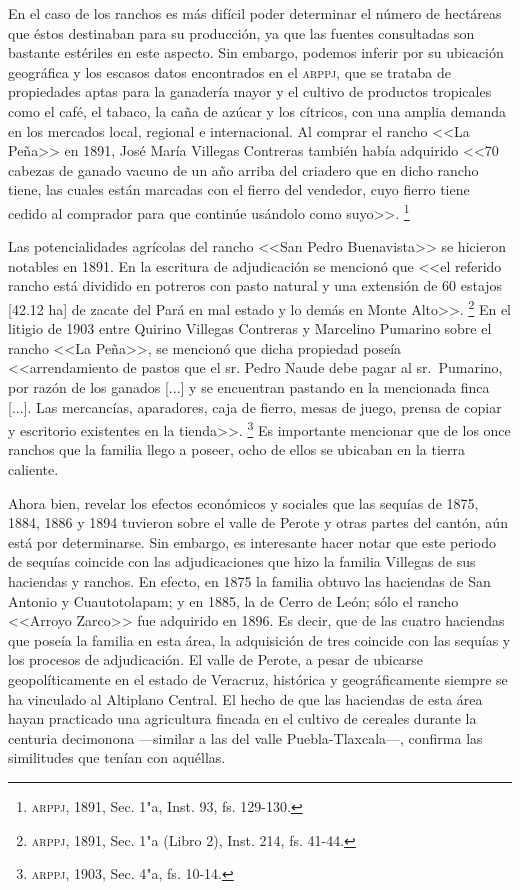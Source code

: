 \documentclass[14pt,twoside,final]{extbook} %
\let\oldfootnote\footnote
\renewcommand\footnote[1]{%
\oldfootnote{\hspace{1mm}#1}}
\begin{document}
En el caso de los ranchos es más difícil poder determinar el número de hectáreas que éstos destinaban para su producción, ya que las fuentes consultadas son bastante estériles en este aspecto. Sin embargo, podemos inferir por su ubicación geográfica y los escasos datos encontrados en el \textsc{arppj}, que se trataba de propiedades aptas para la ganadería mayor y el cultivo de productos tropicales como el café, el tabaco, la caña de azúcar y los cítricos, con una amplia demanda en los mercados local, regional e internacional. Al comprar el rancho <<La Peña>> en 1891, José María Villegas Contreras también había adquirido <<70 cabezas de ganado vacuno de un año arriba del
criadero que en dicho rancho tiene, las cuales están marcadas con el fierro del vendedor, cuyo fierro tiene cedido al comprador para que continúe usándolo como suyo>>.\footnote{\textsc{arppj}, 1891, Sec. 1"a, Inst. 93, fs. 129-130.}

Las potencialidades agrícolas del rancho <<San Pedro Buenavista>> se hicieron notables en 1891. En la escritura de adjudicación se mencionó que <<el referido rancho está dividido en potreros con pasto natural y una extensión de 60 estajos [42.12 ha] de zacate del Pará en mal estado y lo demás en Monte Alto>>.\footnote{\textsc{arppj}, 1891, Sec. 1"a (Libro 2), Inst. 214, fs. 41-44.} En el litigio de 1903 entre Quirino Villegas Contreras y Marcelino Pumarino sobre el rancho <<La Peña>>, se mencionó que dicha propiedad poseía <<arrendamiento de pastos que el sr. Pedro Naude debe pagar al sr.~Pumarino, por razón de los ganados [...] y se encuentran pastando en la mencionada finca [...]. Las mercancías, aparadores, caja de fierro, mesas de juego, prensa de copiar y escritorio existentes en la tienda>>.\footnote{\textsc{arppj}, 1903, Sec. 4"a, fs. 10-14.} Es importante mencionar que de los once ranchos que la familia llego a poseer, ocho de ellos se ubicaban en la tierra caliente.

Ahora bien, revelar los efectos económicos y sociales que las sequías de 1875, 1884, 1886 y 1894 tuvieron sobre el valle de Perote y otras partes del cantón, aún está por determinarse. Sin embargo, es interesante hacer notar que este periodo de sequías coincide con las adjudicaciones que hizo la familia Villegas de sus haciendas y ranchos. En efecto, en 1875 la familia obtuvo las haciendas de San Antonio y Cuautotolapam; y en 1885, la de Cerro de León; sólo el rancho <<Arroyo Zarco>> fue adquirido en 1896. Es decir, que de las cuatro haciendas que poseía la familia en esta área, la adquisición de tres coincide con las sequías y los procesos de adjudicación. El valle de Perote, a pesar de ubicarse geopolíticamente en el estado de Veracruz, histórica y geográficamente siempre se ha vinculado al Altiplano Central. El hecho de que las haciendas de esta área hayan practicado una agricultura fincada en el cultivo de cereales durante la centuria decimonona ---similar a las del valle Puebla-Tlaxcala---, confirma las similitudes que tenían con aquéllas.
\end{document}
